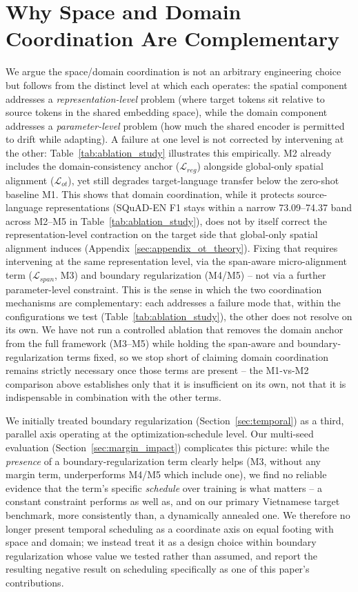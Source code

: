 \documentclass[11pt]{article}
\begin{document}
\section{Why Space and Domain Coordination Are Complementary}
\label{sec:appendix_three_axes}
We argue the space/domain coordination is not an arbitrary engineering choice but follows from the distinct level at which each operates: the spatial component addresses a \emph{representation-level} problem (where target tokens sit relative to source tokens in the shared embedding space), while the domain component addresses a \emph{parameter-level} problem (how much the shared encoder is permitted to drift while adapting). A failure at one level is not corrected by intervening at the other: Table~\ref{tab:ablation_study} illustrates this empirically. M2 already includes the domain-consistency anchor ($\mathcal{L}_{reg}$) alongside global-only spatial alignment ($\mathcal{L}_{ot}$), yet still degrades target-language transfer below the zero-shot baseline M1. This shows that domain coordination, while it protects source-language representations (SQuAD-EN F1 stays within a narrow 73.09--74.37 band across M2--M5 in Table~\ref{tab:ablation_study}), does not by itself correct the representation-level contraction on the target side that global-only spatial alignment induces (Appendix~\ref{sec:appendix_ot_theory}). Fixing that requires intervening at the same representation level, via the span-aware micro-alignment term ($\mathcal{L}_{span}$, M3) and boundary regularization (M4/M5) -- not via a further parameter-level constraint. This is the sense in which the two coordination mechanisms are complementary: each addresses a failure mode that, within the configurations we test (Table~\ref{tab:ablation_study}), the other does not resolve on its own. We have not run a controlled ablation that removes the domain anchor from the full framework (M3--M5) while holding the span-aware and boundary-regularization terms fixed, so we stop short of claiming domain coordination remains strictly necessary once those terms are present -- the M1-vs-M2 comparison above establishes only that it is insufficient on its own, not that it is indispensable in combination with the other terms.

We initially treated boundary regularization (Section~\ref{sec:temporal}) as a third, parallel axis operating at the optimization-schedule level. Our multi-seed evaluation (Section~\ref{sec:margin_impact}) complicates this picture: while the \emph{presence} of a boundary-regularization term clearly helps (M3, without any margin term, underperforms M4/M5 which include one), we find no reliable evidence that the term's specific \emph{schedule} over training is what matters -- a constant constraint performs as well as, and on our primary Vietnamese target benchmark, more consistently than, a dynamically annealed one. We therefore no longer present temporal scheduling as a coordinate axis on equal footing with space and domain; we instead treat it as a design choice within boundary regularization whose value we tested rather than assumed, and report the resulting negative result on scheduling specifically as one of this paper's contributions.
\end{document}
